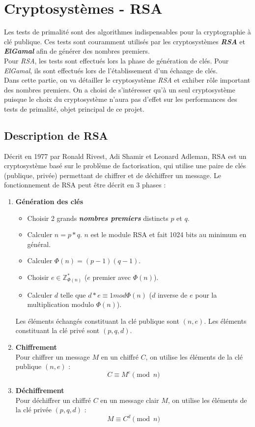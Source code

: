 \section{Cryptosystèmes - RSA}

	Les tests de primalité sont des algorithmes indispensables pour la cryptographie à clé publique. Ces tests sont couramment utilisés par les cryptosystèmes \textbf{\textit{RSA}} et \textbf{\textit{ElGamal}} afin de générer des nombres premiers.\\
	Pour \textit{RSA}, les tests sont effectués lors la phase de génération de clés. Pour \textit{ElGamal}, ils sont effectués lors de l'établissement d'un échange de clés.\\
	Dans cette partie, on va détailler le cryptosystème \textit{RSA} et exhiber rôle important des nombres premiers. On a choisi de s'intéresser qu'à un seul cryptosystème puisque le choix du cryptosystème n'aura pas d'effet sur les performances des tests de primalité, objet principal de ce projet.
	
	\subsection{Description de RSA}
	Décrit en 1977 par Ronald Rivest, Adi Shamir et Leonard Adleman, RSA est un cryptosystème basé sur le problème de factorisation, qui utilise une paire de clés (publique, privée) permettant de chiffrer et de déchiffrer un message. Le fonctionnement de RSA peut être décrit en 3 phases :
		\begin{enumerate}[leftmargin=2em]
			\vspace{1em}
			\item \textbf{Génération des clés} 
			\begin{itemize}
				\item Choisir 2 grands \textbf{\textit{nombres premiers}} distincts $p$ et $q$.
				\item Calculer $n = p * q$. $n$ est le module RSA et fait 1024 bits au minimum en général.
				\item Calculer $\Phi(n) = (p - 1)(q - 1)$.
				\item Choisir $e \in \mathbb{Z}_{\Phi(n)}^{*}$ ($e$ premier avec $\Phi(n)$).
				\item Calculer $d$ telle que $d*e \equiv 1 mod \Phi(n)$ ($d$ inverse de $e$ pour la multiplication modulo $\Phi(n)$).
			\end{itemize}
			Les éléments échangés constituant la clé publique sont $(n, e)$. Les éléments constituant la clé privé sont $(p, q, d)$.
			\vspace{1em}
			\item \textbf{Chiffrement}\\
			Pour chiffrer un message $M$ en un chiffré $C$, on utilise les éléments de la clé publique $(n, e)$ :
			\[C \equiv M^{e} \pmod n\]		
			
			\item \textbf{Déchiffrement}\\
			Pour déchiffrer un chiffré $C$ en un message clair $M$, on utilise les éléments de la clé privée $(p, q, d)$ :
			\[M \equiv C^{d} \pmod n\]
		\end{enumerate}
		
